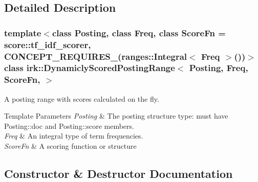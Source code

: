 \subsection{Detailed Description}
\subsubsection*{template$<$class Posting, class Freq, class Score\+Fn = score\+::tf\+\_\+idf\+\_\+scorer, C\+O\+N\+C\+E\+P\+T\+\_\+\+R\+E\+Q\+U\+I\+R\+E\+S\+\_\+(ranges\+::\+Integral$<$ Freq $>$())$>$\newline
class irk\+::\+Dynamicly\+Scored\+Posting\+Range$<$ Posting, Freq, Score\+Fn, $>$}

A posting range with scores calculated on the fly. 


\begin{DoxyTemplParams}{Template Parameters}
{\em Posting} & The posting structure type\+: must have {\ttfamily Posting\+::doc} and {\ttfamily Posting\+::score} members. \\
\hline
{\em Freq} & An integral type of term frequencies. \\
\hline
{\em Score\+Fn} & A scoring function or structure \\
\hline
\end{DoxyTemplParams}


\subsection{Constructor \& Destructor Documentation}
\mbox{\label{classirk_1_1DynamiclyScoredPostingRange_abad4cca22012d95af138b66e9988f4e5}} 
